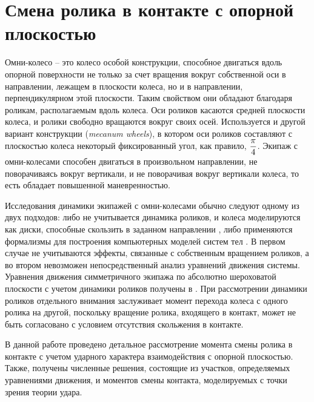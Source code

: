 \chapter{Смена ролика в контакте с опорной плоскостью}

Омни-колесо -- это колесо особой конструкции, способное двигаться вдоль опорной поверхности не только за счет вращения вокруг собственной оси в направлении, лежащем в плоскости колеса, но и в направлении, перпендикулярном этой плоскости. Таким свойством они обладают благодаря роликам, располагаемым вдоль колеса. Оси роликов касаются средней плоскости колеса, и ролики свободно вращаются вокруг своих осей. Используется и другой вариант конструкции (\textit{mecanum wheels}), в котором оси роликов составляют с плоскостью колеса некоторый фиксированный угол, как правило, $\displaystyle\frac{\displaystyle \pi}{\displaystyle 4}$. Экипаж с омни-колесами способен двигаться в произвольном направлении, не поворачиваясь вокруг вертикали, и не поворачивая вокруг вертикали колеса, то есть обладает повышенной маневренностью.

Исследования динамики экипажей с омни-колесами обычно следуют одному из двух подходов: либо не учитывается динамика роликов, и колеса моделируются как диски, способные скользить в заданном направлении \cite{ZobovaTatarinovPMM, formalskii, borisov, ZobovaTatarinovAspecty2006, zobova2008svobodnye8020851, Martynenko2010}, либо применяются формализмы для построения компьютерных моделей систем тел \cite{KosenkoGerasimov, Tobolar, Williams2002, Ashmore2002}. В первом случае не учитываются эффекты, связанные с собственным вращением роликов, а во втором невозможен непосредственный анализ уравнений движения системы. Уравнения движения симметричного экипажа по абсолютно шероховатой плоскости с учетом динамики роликов получены в \cite{ZobovaGerasimovPMM}. При рассмотрении динамики роликов отдельного внимания заслуживает момент перехода колеса с одного ролика на другой, поскольку вращение ролика, входящего в контакт, может не быть согласовано с условием отсутствия скольжения в контакте.

В данной работе проведено детальное рассмотрение момента смены ролика в контакте с учетом ударного характера взаимодействия с опорной плоскостью. Также, получены численные решения, состоящие из участков, определяемых уравнениями движения, и моментов смены контакта, моделируемых с точки зрения теории удара.